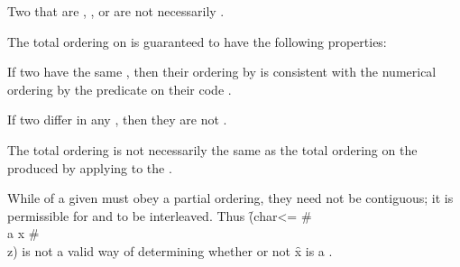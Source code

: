 \endsubsubsection%

\endsubSection%


Two  that are , , or  
are not necessarily .

\endsubSection%


The total ordering on  is guaranteed to have 
the following properties: 

\beginlist


\itemitem{\bull} 
If two  have the same  ,
then their ordering by  is consistent with the numerical
ordering by the predicate \funref{<} on their code .

\itemitem{\bull} If two  differ in any , then they
are not .


\itemitem{\bull}
  The total ordering is not necessarily the same as the total ordering
  on the  produced by applying  to the
  .

\itemitem{\bull} 
  While   of a given 
  must    
  obey a partial ordering,
  they need not be contiguous; it is permissible for 
   and   to be interleaved. 
  Thus \f{(char<= \#\\a x \#\\z)} 
  is not a valid way of determining whether or not \f{x} is a
   .  


